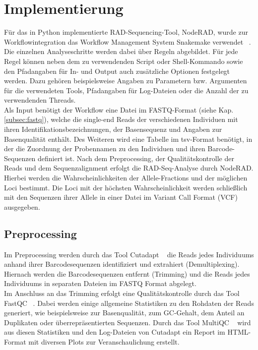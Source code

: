 \chapter{Implementierung} \label{sec:alg}
Für das in Python implementierte RAD-Sequencing-Tool, NodeRAD, wurde zur Workflowintegration das Workflow Management System Snakemake verwendet ~\cite{koester_2012_1, koester_2012_2}. Die einzelnen Analyseschritte werden dabei über Regeln abgebildet. Für jede Regel können neben dem zu verwendenden Script oder Shell-Kommando sowie den Pfadangaben für In- und Output auch zusätzliche Optionen festgelegt werden. Dazu gehören beispielsweise Angaben zu Parametern bzw. Argumenten für die verwendeten Tools, Pfadangaben für Log-Dateien oder die Anzahl der zu verwendenden Threads. \\

Als Input benötigt der Workflow eine Datei im FASTQ-Format (siehe Kap. \ref{subsec:fastq}), welche die single-end Reads der verschiedenen Individuen mit ihren Identifikationsbezeichnungen, der Basensequenz und Angaben zur  Basenqualität enthält. Des Weiteren wird eine Tabelle im tsv-Format benötigt, in der die Zuordnung der Probennamen zu den Individuen und ihren Barcode-Sequenzen definiert ist. Nach dem Preprocessing, der Qualitätskontrolle der Reads und dem Sequenzalignment erfolgt die RAD-Seq-Analyse durch NodeRAD. Hierbei werden die Wahrscheinlichkeiten der Allele-Fractions und der möglichen Loci bestimmt. Die Loci mit der höchsten Wahrscheinlichkeit werden schließlich mit den Sequenzen ihrer Allele in einer Datei im Variant Call Format (VCF) ausgegeben.

\section{Preprocessing} \label{sec:preproc}

Im Preprocessing werden durch das Tool Cutadapt ~\cite{martin_2011} die Reads jedes Individuums anhand ihrer Barcodesequenzen identifiziert und extrahiert (Demultiplexing). Hiernach werden die Barcodesequenzen entfernt (Trimming) und die Reads jedes Individuums in separaten Dateien im FASTQ Format abgelegt. \\
Im Anschluss an das Trimming erfolgt eine Qualitätskontrolle durch das Tool FastQC  ~\cite{andrews_2012}. Dabei werden einige allgemeine Statistiken zu den Rohdaten der Reads generiert, wie beispielsweise zur Basenqualität, zum GC-Gehalt, dem Anteil an Duplikaten oder überrepräsentierten Sequenzen. Durch das Tool MultiQC ~\cite{ewels_2016} wird aus diesen Statistiken und den Log-Dateien von Cutadapt ein Report im HTML-Format mit diversen Plots zur Veranschaulichung erstellt.

